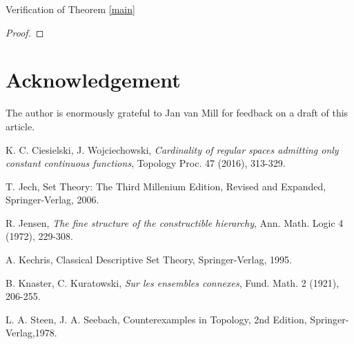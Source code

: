 \documentclass{amsart}
\theoremstyle{definition}\newtheorem{theorem}{Theorem}
\theoremstyle{definition}\newtheorem{bigtheorem}{Theorem}
\numberwithin{theorem}{section}
\theoremstyle{definition}\newtheorem{corollary}[theorem]{Corollary}
\theoremstyle{definition}\newtheorem{proposition}[theorem]{Proposition}
\theoremstyle{definition}\newtheorem{definition}[theorem]{Definition}
\theoremstyle{definition}\newtheorem{question}[theorem]{Question}
\theoremstyle{definition}\newtheorem{example}[theorem]{Example}
\theoremstyle{definition}\newtheorem{remark}[theorem]{Remark}
\theoremstyle{definition}\newtheorem{note}[theorem]{Note}
\theoremstyle{definition}\newtheorem{lemma}[theorem]{Lemma}
\theoremstyle{definition}\newtheorem{fact}[theorem]{Fact}
\theoremstyle{definition}\newtheorem{define}[theorem]{Definition}
\theoremstyle{definition}\newtheorem{definitions}[theorem]{Definitions}
\theoremstyle{definition}\newtheorem{claim}[theorem]{Claim}
\theoremstyle{definition}\newtheorem{obs}[theorem]{Observation}
\theoremstyle{definition}\newtheorem{construction}[theorem]{Construction}
\begin{document}
\begin{section}{Verification of Theorem \ref{main}}
\begin{proof}
\end{proof}













\end{section}


\section*{Acknowledgement}

The author is enormously grateful to Jan van Mill for feedback on a draft of this article.


\begin{thebibliography}{A}

 K. C. Ciesielski, J. Wojciechowski, \emph{Cardinality of regular spaces admitting only constant continuous functions}, Topology Proc. 47 (2016), 313-329.

 T. Jech, Set Theory: The Third Millenium Edition, Revised and Expanded, Springer-Verlag, 2006.

 R. Jensen, \emph{The fine structure of the constructible hierarchy}, Ann. Math. Logic 4 (1972), 229-308.

 A. Kechris, Classical Descriptive Set Theory, Springer-Verlag, 1995.

 B. Knaster, C. Kuratowski, \emph{Sur les ensembles connexes}, Fund. Math. 2 (1921), 206-255.

 L. A. Steen, J. A. Seebach, Counterexamples in Topology, 2nd Edition, Springer-Verlag,1978. 



\end{thebibliography}
\end{document}

